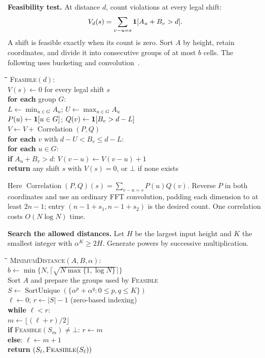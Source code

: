 \documentclass[11pt]{article}
\begin{document}
\textbf{Feasibility test.}
At distance $d$, count violations at every legal shift:
\[
 V_d(s)=\sum_{v-u=s}{\bf1}[A_u+B_v>d].
\]
A shift is feasible exactly when its count is zero. Sort $A$ by height,
retain coordinates, and divide it into consecutive groups of at most $b$
cells. The following uses bucketing and convolution~\cite{dominance}.
\begin{tabbing}
\quad\=\quad\=\quad\=\quad\=\kill
\textsc{Feasible}$(d)$:\\
\> $V(s)\gets0$ for every legal shift $s$\\
\> \textbf{for each} group $G$:\\
\>\> $L\gets\min_{u\in G}A_u$; $U\gets\max_{u\in G}A_u$\\
\>\> $P(u)\gets{\bf1}[u\in G]$; $Q(v)\gets{\bf1}[B_v>d-L]$\\
\>\> $V\gets V+\operatorname{Correlation}(P,Q)$\\
\>\> \textbf{for each} $v$ with $d-U<B_v\le d-L$:\\
\>\>\> \textbf{for each} $u\in G$:\\
\>\>\>\> \textbf{if} $A_u+B_v>d$: $V(v-u)\gets V(v-u)+1$\\
\> \textbf{return} any shift $s$ with $V(s)=0$, or $\bot$ if none exists
\end{tabbing}
Here $\operatorname{Correlation}(P,Q)(s)=\sum_{v-u=s}P(u)Q(v)$.
Reverse $P$ in both coordinates and use an ordinary FFT convolution,
padding each dimension to at least $2n-1$; entry $(n-1+s_1,n-1+s_2)$
is the desired count. One correlation costs $O(N\log N)$ time.

\textbf{Search the allowed distances.}
Let $H$ be the largest input height and $K$ the smallest integer with
$\alpha^K\ge2H$. Generate powers by successive multiplication.
\begin{tabbing}
\quad\=\quad\=\quad\=\kill
\textsc{MinimumDistance}$(A,B,\alpha)$:\\
\> $b\gets\min\{N,\lceil\sqrt{N\max\{1,\log N\}}\rceil\}$\\
\> Sort $A$ and prepare the groups used by \textsc{Feasible}\\
\> $S\gets\operatorname{SortUnique}(\{\alpha^p+\alpha^q:0\le p,q\le K\})$\\
\> $\ell\gets0$; $r\gets|S|-1$ \quad (zero-based indexing)\\
\> \textbf{while} $\ell<r$:\\
\>\> $m\gets\lfloor(\ell+r)/2\rfloor$\\
\>\> \textbf{if} \textsc{Feasible}$(S_m)\ne\bot$: $r\gets m$\\
\>\> \textbf{else}: $\ell\gets m+1$\\
\> \textbf{return} $(S_\ell,\textsc{Feasible}(S_\ell))$
\end{tabbing}
\end{document}
